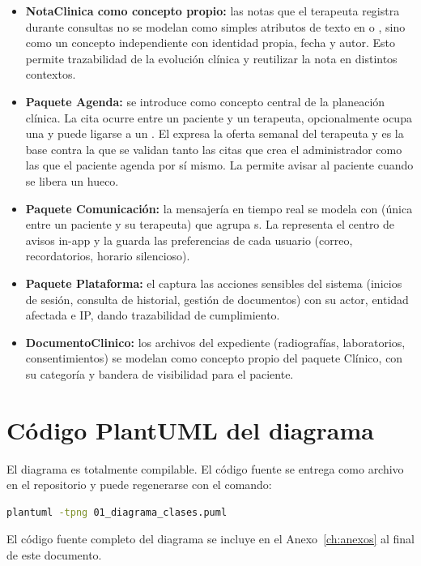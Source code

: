 \begin{itemize}
  \item \textbf{NotaClinica como concepto propio:} las notas que el terapeuta registra durante consultas no se modelan como simples atributos de texto en  o , sino como un concepto independiente con identidad propia, fecha y autor. Esto permite trazabilidad de la evolución clínica y reutilizar la nota en distintos contextos.

  \item \textbf{Paquete Agenda:} se introduce  como concepto central de la planeación clínica. La cita ocurre entre un paciente y un terapeuta, opcionalmente ocupa una  y puede ligarse a un . El  expresa la oferta semanal del terapeuta y es la base contra la que se validan tanto las citas que crea el administrador como las que el paciente agenda por sí mismo. La  permite avisar al paciente cuando se libera un hueco.

  \item \textbf{Paquete Comunicación:} la mensajería en tiempo real se modela con  (única entre un paciente y su terapeuta) que agrupa s. La  representa el centro de avisos in-app y la  guarda las preferencias de cada usuario (correo, recordatorios, horario silencioso).

  \item \textbf{Paquete Plataforma:} el  captura las acciones sensibles del sistema (inicios de sesión, consulta de historial, gestión de documentos) con su actor, entidad afectada e IP, dando trazabilidad de cumplimiento.

  \item \textbf{DocumentoClinico:} los archivos del expediente (radiografías, laboratorios, consentimientos) se modelan como concepto propio del paquete Clínico, con su categoría y bandera de visibilidad para el paciente.
\end{itemize}

\section{Código PlantUML del diagrama}

El diagrama es totalmente compilable. El código fuente se entrega como archivo  en el repositorio y puede regenerarse con el comando:

\begin{lstlisting}[language=bash]
plantuml -tpng 01_diagrama_clases.puml
\end{lstlisting}

El código fuente completo del diagrama se incluye en el Anexo~\ref{ch:anexos} al final de este documento.
